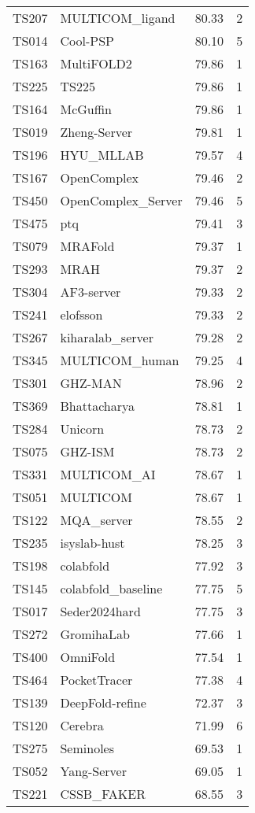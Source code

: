 \begin{table}[ht]
{\begin{tabular}{llrr}
TS207 & MULTICOM\_ligand & 80.33 & 2 \\ 
TS014 & Cool-PSP & 80.10 & 5 \\ 
TS163 & MultiFOLD2 & 79.86 & 1 \\ 
TS225 & TS225 & 79.86 & 1 \\ 
TS164 & McGuffin & 79.86 & 1 \\ 
TS019 & Zheng-Server & 79.81 & 1 \\ 
TS196 & HYU\_MLLAB & 79.57 & 4 \\ 
TS167 & OpenComplex & 79.46 & 2 \\ 
TS450 & OpenComplex\_Server & 79.46 & 5 \\ 
TS475 & ptq & 79.41 & 3 \\ 
TS079 & MRAFold & 79.37 & 1 \\ 
TS293 & MRAH & 79.37 & 2 \\ 
TS304 & AF3-server & 79.33 & 2 \\ 
TS241 & elofsson & 79.33 & 2 \\ 
TS267 & kiharalab\_server & 79.28 & 2 \\ 
TS345 & MULTICOM\_human & 79.25 & 4 \\ 
TS301 & GHZ-MAN & 78.96 & 2 \\ 
TS369 & Bhattacharya & 78.81 & 1 \\ 
TS284 & Unicorn & 78.73 & 2 \\ 
TS075 & GHZ-ISM & 78.73 & 2 \\ 
TS331 & MULTICOM\_AI & 78.67 & 1 \\ 
TS051 & MULTICOM & 78.67 & 1 \\ 
TS122 & MQA\_server & 78.55 & 2 \\ 
TS235 & isyslab-hust & 78.25 & 3 \\ 
TS198 & colabfold & 77.92 & 3 \\ 
TS145 & colabfold\_baseline & 77.75 & 5 \\ 
TS017 & Seder2024hard & 77.75 & 3 \\ 
TS272 & GromihaLab & 77.66 & 1 \\ 
TS400 & OmniFold & 77.54 & 1 \\ 
TS464 & PocketTracer & 77.38 & 4 \\ 
TS139 & DeepFold-refine & 72.37 & 3 \\ 
TS120 & Cerebra & 71.99 & 6 \\ 
TS275 & Seminoles & 69.53 & 1 \\ 
TS052 & Yang-Server & 69.05 & 1 \\ 
TS221 & CSSB\_FAKER & 68.55 & 3 \\ 

\end{tabular}}
\end{table}
